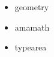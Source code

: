 \documentclass{article}
\begin{document}
\begin{itemize}
\item geometry
\item amamath
\item typearea
\end{itemize}
\end{document}
